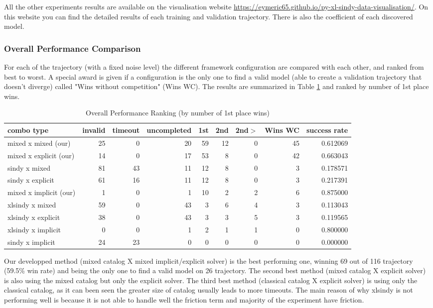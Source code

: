 \documentclass[12pt]{article}
\begin{document}
All the other experiments results are available on the visualisation website \url{https://eymeric65.github.io/py-xl-sindy-data-visualisation/}. On this website you can find the detailed results of each training and validation trajectory. There is also the coefficient of each discovered model.

\subsubsection*{Overall Performance Comparison}


For each of the trajectory (with a fixed noise level) the different framework configuration are compared with each other, and ranked from best to worst. A special award is given if a configuration is the only one to find a valid model (able to create a validation trajectory that doesn't diverge) called "Wins without competition" (Wins WC). The results are summarized in Table \ref{tab:results_summary} and ranked by number of 1st place wins.

\begin{table}[h]
\centering
\caption{Overall Performance Ranking (by number of 1st place wins)}
\label{tab:results_summary}
\small
\begin{tabular}{lrrrrrrrr}
\hline
combo type & invalid & timeout & uncompleted & 1st & 2nd & 2nd$>$ & Wins WC & success rate \\
\hline
mixed x mixed (our) & 25 & 0 & 20 & 59 & 12 & 0 & 45 & 0.612069 \\
mixed x explicit (our) & 14 & 0 & 17 & 53 & 8 & 0 & 42 & 0.663043 \\
sindy x mixed & 81 & 43 & 11 & 12 & 8 & 0 & 3 & 0.178571 \\
sindy x explicit & 61 & 16 & 11 & 12 & 8 & 0 & 3 & 0.217391 \\
mixed x implicit (our)& 1 & 0 & 1 & 10 & 2 & 2 & 6 & 0.875000 \\
xlsindy x mixed & 59 & 0 & 43 & 3 & 6 & 4 & 3 & 0.113043 \\
xlsindy x explicit & 38 & 0 & 43 & 3 & 3 & 5 & 3 & 0.119565 \\
xlsindy x implicit & 0 & 0 & 1 & 2 & 1 & 1 & 0 & 0.800000 \\
sindy x implicit & 24 & 23 & 0 & 0 & 0 & 0 & 0 & 0.000000 \\
\hline
\end{tabular}
\end{table}



Our developped method (mixed catalog X mixed implicit/explicit solver) is the best performing one, winning 69 out of 116 trajectory (59.5\% win rate) and being the only one to find a valid model on 26 trajectory. The second best method (mixed catalog X explicit solver) is also using the mixed catalog but only the explicit solver. The third best method (classical catalog X explicit solver) is using only the classical catalog, as it can been seen the greater size of catalog usually leads to more timeouts. 
The main reason of why xlsindy is not performing well is because it is not able to handle well the friction term and majority of the experiment have friction.
\end{document}
